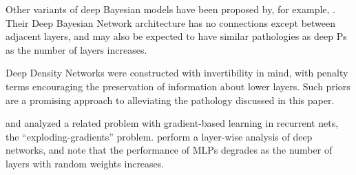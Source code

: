 \documentclass[twoside]{article}
\makeatletter
\newlength{\nonHumbleHeight}
\def\@humbleformat#1{{\settoheight{\nonHumbleHeight}{#1}\resizebox{!}{0.94\nonHumbleHeight}{#1}}}%
\def\humble#1{\@humbleformat{#1}}%
\newcommand{\gp}{{\humble GP}}
\makeatother
\begin{document}
Other variants of deep Bayesian models have been proposed by, for example, \citet{adams2010learning}. %
Their Deep Bayesian Network architecture has no connections except between adjacent layers, and may also be expected to have similar pathologies as deep \gp{}s as the number of layers increases.

Deep Density Networks \citep{rippel2013high} were constructed with invertibility in mind, with penalty terms encouraging the preservation of information about lower layers. Such priors are a promising approach to alleviating the pathology discussed in this paper.
%
%


%
\cite{bengio1994learning} and \cite{pascanu2012understanding} analyzed a related problem with gradient-based learning in recurrent nets, the ``exploding-gradients'' problem.
%
%
%
\cite{montavon2010layer} perform a layer-wise analysis of deep networks, and note that the performance of MLPs degrades as the number of layers with random weights increases.


\end{document}
